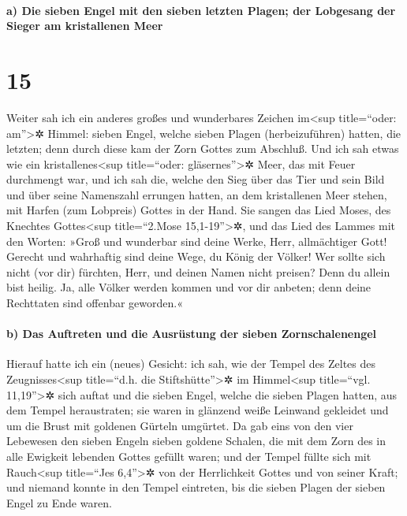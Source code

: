 \hypertarget{a-die-sieben-engel-mit-den-sieben-letzten-plagen-der-lobgesang-der-sieger-am-kristallenen-meer}{%
\paragraph{a) Die sieben Engel mit den sieben letzten Plagen; der
Lobgesang der Sieger am kristallenen
Meer}\label{a-die-sieben-engel-mit-den-sieben-letzten-plagen-der-lobgesang-der-sieger-am-kristallenen-meer}}

\hypertarget{section-14}{%
\section{15}\label{section-14}}

 Weiter sah ich ein anderes großes und wunderbares Zeichen
im\textless sup title=``oder: am''\textgreater✲ Himmel: sieben Engel,
welche sieben Plagen (herbeizuführen) hatten, die letzten; denn durch
diese kam der Zorn Gottes zum Abschluß.  Und ich sah etwas
wie ein kristallenes\textless sup title=``oder: gläsernes''\textgreater✲
Meer, das mit Feuer durchmengt war, und ich sah die, welche den Sieg
über das Tier und sein Bild und über seine Namenszahl errungen hatten,
an dem kristallenen Meer stehen, mit Harfen (zum Lobpreis) Gottes in der
Hand.  Sie sangen das Lied Moses, des Knechtes
Gottes\textless sup title=``2.Mose 15,1-19''\textgreater✲, und das Lied
des Lammes mit den Worten: »Groß und wunderbar sind deine Werke, Herr,
allmächtiger Gott! Gerecht und wahrhaftig sind deine Wege, du König der
Völker!  Wer sollte sich nicht (vor dir) fürchten, Herr,
und deinen Namen nicht preisen? Denn du allein bist heilig. Ja, alle
Völker werden kommen und vor dir anbeten; denn deine Rechttaten sind
offenbar geworden.«

\hypertarget{b-das-auftreten-und-die-ausruxfcstung-der-sieben-zornschalenengel}{%
\paragraph{b) Das Auftreten und die Ausrüstung der sieben
Zornschalenengel}\label{b-das-auftreten-und-die-ausruxfcstung-der-sieben-zornschalenengel}}

 Hierauf hatte ich ein (neues) Gesicht: ich sah, wie der
Tempel des Zeltes des Zeugnisses\textless sup title=``d.h. die
Stiftshütte''\textgreater✲ im Himmel\textless sup title=``vgl.
11,19''\textgreater✲ sich auftat  und die sieben Engel,
welche die sieben Plagen hatten, aus dem Tempel heraustraten; sie waren
in glänzend weiße Leinwand gekleidet und um die Brust mit goldenen
Gürteln umgürtet.  Da gab eins von den vier Lebewesen den
sieben Engeln sieben goldene Schalen, die mit dem Zorn des in alle
Ewigkeit lebenden Gottes gefüllt waren;  und der Tempel
füllte sich mit Rauch\textless sup title=``Jes 6,4''\textgreater✲ von
der Herrlichkeit Gottes und von seiner Kraft; und niemand konnte in den
Tempel eintreten, bis die sieben Plagen der sieben Engel zu Ende waren.

